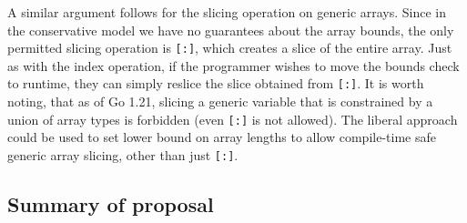 A similar argument follows for the slicing operation on generic arrays. Since in
the conservative model we have no guarantees about the array bounds, the only
permitted slicing operation is \texttt{[:]}, which creates a slice of the entire
array. Just as with the index operation, if the programmer wishes to move the
bounds check to runtime, they can simply reslice the slice obtained from
\texttt{[:]}. It is worth noting, that as of Go 1.21, slicing a generic variable
that is constrained by a union of array types is forbidden (even \texttt{[:]} is
not allowed). The liberal approach could be used to set lower bound on array
lengths to allow compile-time safe generic array slicing, other than just
\texttt{[:]}.

\subsection{Summary of proposal}



